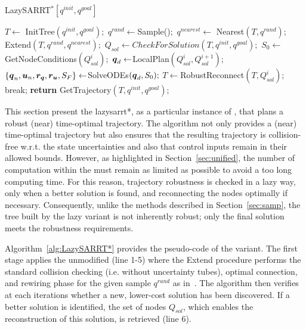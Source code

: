 \begin{algorithm}[t]
    \caption{LazySARRT$^* [q^{init}, q^{goal}]$}\label{alg:LazySARRT*}
    \begin{algorithmic}[1]
        \State $T \gets$ InitTree$({q^{init}, q^{goal}});$
            \State $q^{rand} \gets $Sample()$;$
            \State $q^{nearest} \gets$ Nearest$(T,{q^{rand}});$
            \State Extend$(T, q^{rand}, q^{nearest});$
            \State $Q_{sol} \gets CheckForSolution(T, q^{init}, q^{goal});$
                    \State $S_0 \gets $GetNodeConditions$(Q_{sol}^{i});$
                    \State $\boldsymbol{q}_d \gets $LocalPlan$(Q_{sol}^{i}, Q_{sol}^{i+1});$
                    \State $\left \{\boldsymbol{q}_n, \boldsymbol{u}_n, \boldsymbol{r_q}, \boldsymbol{r_u}, S_F \right \}  \gets $SolveODEs$(\boldsymbol{q}_d, S_0);$
                        \State $T \gets $RobustReconnect$(T, Q_{sol}^{i});$
                        \State break;
                    \EndIf
                \EndFor
            \EndIf
        \EndWhile
        \State \textbf{return} GetTrajectory$(T, q^{init}, q^{goal})$;
    \end{algorithmic}
\end{algorithm}

This section present the \gls{lazysarrt*}, as a particular instance of , that plans a robust (near) time-optimal trajectory.
The algorithm not only provides a (near) time-optimal trajectory but also ensures that the resulting trajectory is collision-free w.r.t. the state uncertainties and also that control inputs remain in their allowed bounds.
However, as highlighted in Section~\ref{sec:unified}, the number of  computation within the  must remain as limited as possible to avoid a too long computing time. 
For this reason, trajectory robustness is checked in a lazy way, only when a better solution is found, and reconnecting the nodes optimally if necessary.
Consequently, unlike the  methods described in Section~\ref{sec:samp}, the tree built by the lazy variant is not inherently robust; only the final solution meets the robustness requirements.

Algorithm~\ref{alg:LazySARRT*} provides the pseudo-code of the  variant.  
The first stage applies the unmodified  (line 1-5) where the Extend procedure performs the standard collision checking (i.e. without uncertainty tubes), optimal connection, and rewiring phase for the given sample  $q^{rand}$ as in~\cite{cRRTstar}.
The algorithm then verifies at each iterations whether a new, lower-cost solution has been discovered. 
If a better solution is identified, the set of nodes $Q_{sol}$, which enables the reconstruction of this solution, is retrieved (line 6).

